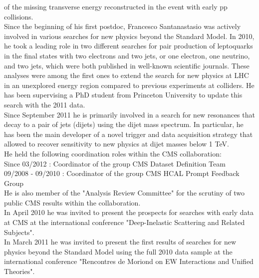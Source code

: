\documentclass[10pt, a4paper]{article}
\begin{document}
of the missing transverse energy reconstructed in the event with early pp collisions. \\
Since the beginning of his first postdoc, Francesco Santanastasio 
was actively involved in various searches for new physics beyond the Standard Model.
In 2010, he took a leading role in two different searches for pair production 
of leptoquarks in the final states with two electrons and two jets, or one electron, one neutrino, and two jets, which were both published in well-known scientific journals. 
These analyses were among the first ones to extend the search for new physics 
at LHC in an unexplored energy region compared to previous experiments at 
colliders. He has been supervising a PhD student from 
Princeton University to update this search with the 2011 data.\\
Since September 2011 he is primarily involved in a search for new 
resonances that decay to a pair of jets (dijets) using the dijet mass spectrum. 
In particular, he has been the main developer of a novel trigger and
data acquisition strategy that allowed to recover sensitivity 
to new physics at dijet masses below 1 TeV.\\
He held the following coordination roles within the CMS collaboration: \\
Since 03/2012 : Coordinator of the group CMS Dataset Definition Team \\
09/2008 - 09/2010 : Coordinator of the group CMS HCAL Prompt Feedback Group \\    
He is also member of the "Analysis Review Committee" for the scrutiny of two public 
CMS results within the collaboration.\\
In April 2010 he was invited to present the prospects for searches with early data at CMS at the international conference "Deep-Inelastic Scattering and Related Subjects". \\ 
In March 2011 he was invited to present the first results of searches for new physics beyond the Standard Model using the full 2010 data sample at the international conference "Rencontres de Moriond on EW Interactions and Unified Theories". \\
\end{document}
